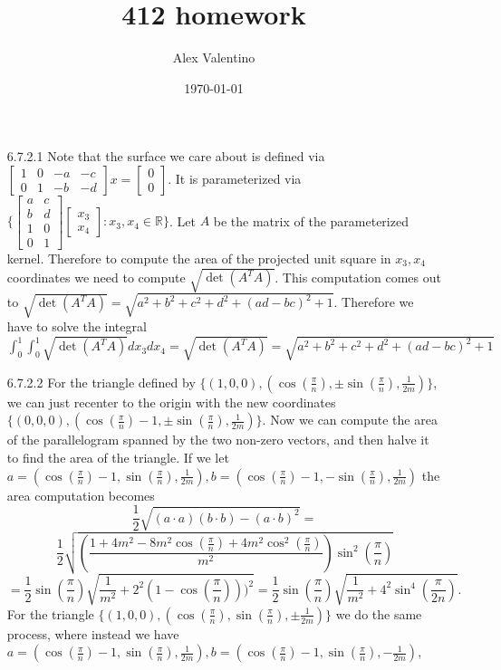 \documentclass[12pt, letterpaper]{article}
\date{\today}
\author{Alex Valentino}
\title{412 homework}
\newcommand{\R}{\mathbb{R}}
\begin{document}
\begin{enumerate}
	\item[6.7.2.1] Note that the surface we care about is defined 
	via 
	$\begin{bmatrix}
		1 & 0 & -a & -c\\ 0 & 1 & -b & -d
\end{bmatrix} x = \begin{bmatrix}
0\\ 0
\end{bmatrix}	 $.  It is parameterized via 
$\{\begin{bmatrix}
 a & c\\ b & d\\ 1 & 0\\ 0 & 1
\end{bmatrix} \begin{bmatrix}
x_3\\ x_4
\end{bmatrix} : x_3,x_4 \in \R \} $.  Let $A$ be the matrix 
of the parameterized kernel.  Therefore to compute 
the area of the projected unit square in $x_3,x_4$ coordinates 
we need to compute $\sqrt{\det(A^T A)}$.  This computation 
comes out to 
$\sqrt{\det(A^T A)} = 
\sqrt{a^2+b^2+c^2+d^2 +(ad-bc)^2 + 1}$.  Therefore 
we have to solve the integral 
$\int_0^1 \int_0^1\sqrt{\det(A^T A)} dx_3 dx_4 = \sqrt{\det(A^T A)}
= \sqrt{a^2+b^2+c^2+d^2 +(ad-bc)^2 + 1}$
	\item[6.7.2.2] For the triangle defined by 
	$\{(1,0,0), (\cos(\frac{\pi}{n}), \pm \sin(\frac{\pi}{n}), \frac{1}{2m})\}$, we can just recenter to the origin with the new 
	coordinates $\{(0,0,0), (\cos(\frac{\pi}{n})-1, \pm \sin(\frac{\pi}{n}), \frac{1}{2m})\}$.  Now we can compute the area of the parallelogram spanned by the two non-zero vectors, 
	and then halve it to find the area of the triangle.   
	If we let $a = (\cos(\frac{\pi}{n})-1, \sin(\frac{\pi}{n}), \frac{1}{2m}), b=(\cos(\frac{\pi}{n})-1, - \sin(\frac{\pi}{n}), \frac{1}{2m})$ the area computation becomes 
	$$\frac{1}{2}\sqrt{(a\cdot a)(b \cdot b) - (a \cdot b)^2}
	= $$ $$\frac{1}{2} \sqrt{(\frac{1 + 4m^2 - 8m^2 \cos(\frac{\pi}{n}) 
	+ 4m^2\cos^2(\frac{\pi}{n})}{m^2})\sin^2(\frac{\pi}{n})} 
	$$ $$= \frac{1}{2}\sin(\frac{\pi}{n})\sqrt{\frac{1}{m^2} + 
	2^2(1-\cos(\frac{\pi}{n})))^2} = 
	\frac{1}{2}\sin(\frac{\pi}{n})\sqrt{\frac{1}{m^2} + 
	4^2\sin^4(\frac{\pi}{2n})}.
	$$
	For the triangle $\{(1,0,0), (\cos(\frac{\pi}{n}),  \sin(\frac{\pi}{n}), \pm\frac{1}{2m})\}$ we do the same process, 
	where instead we have 
	$a = (\cos(\frac{\pi}{n})-1, \sin(\frac{\pi}{n}), \frac{1}{2m}), b=(\cos(\frac{\pi}{n})-1, \sin(\frac{\pi}{n}), -\frac{1}{2m})$,

\end{enumerate}
\end{document}
